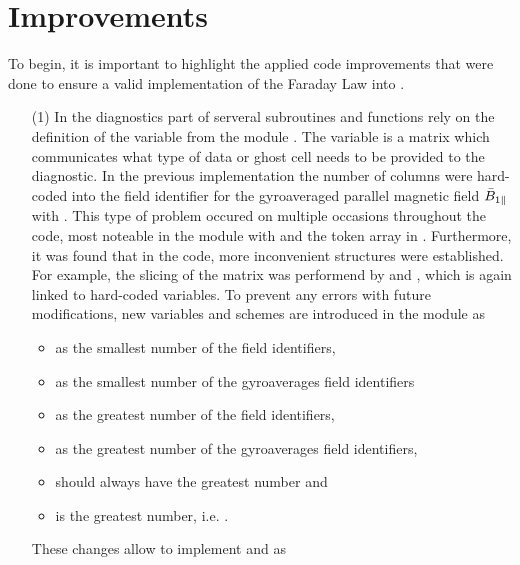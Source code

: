 \section{Improvements}
\label{sec:improvements}

To begin, it is important to highlight the applied code improvements that were done to ensure a valid implementation of the Faraday Law into {\gkw}.
\begin{enumerate}
    \item[(1)] In the diagnostics part of {\gkw} serveral subroutines and functions rely on the definition of the variable  from the module . The variable  is a matrix which communicates what type of data or ghost cell needs to be provided to the diagnostic. In the previous implementation the number of columns were hard-coded into the field identifier for the gyroaveraged parallel magnetic field $\bar{B}_{1\parallel}$ with . This type of problem occured on multiple occasions throughout the code, most noteable in the module  with  and the token array in . Furthermore, it was found that in the code, more inconvenient structures were established. For example, the slicing of the  matrix was performend by  and , which is again linked to hard-coded variables. To prevent any errors with future modifications, new variables and schemes are introduced in the module  as
    \begin{itemize}
        \item {} as the smallest number of the field identifiers, 
        \item {} as the smallest number of the gyroaverages field identifiers
        \item {} as the greatest number of the field identifiers, 
        \item {} as the greatest number of the gyroaverages field identifiers,
        \item {} should always have the greatest number and
        \item {} is the greatest number, i.e. .
    \end{itemize}
    These changes allow to implement  and  as 
    \begin{itemize}

\end{itemize}
\end{enumerate}
